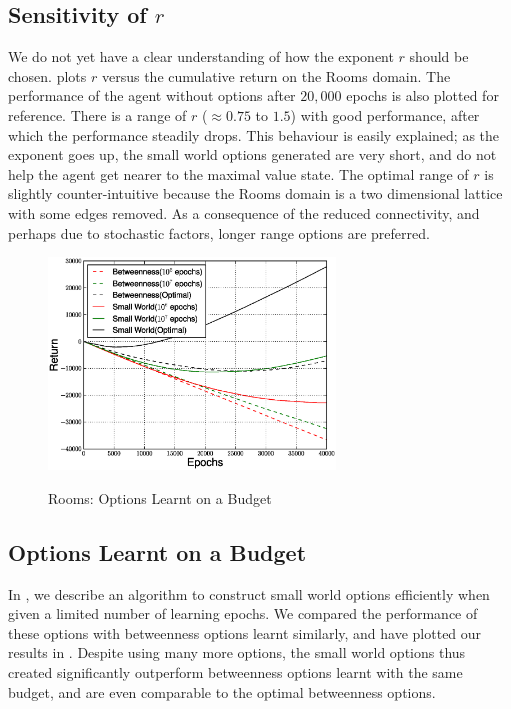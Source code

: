 \subsection{Sensitivity of $r$}
We do not yet have a clear understanding of how the exponent $r$ should
be chosen.  plots $r$ versus the cumulative return
on the Rooms domain. The performance of the agent without options after
$20,000$ epochs is also plotted for reference. There is a range of $r$
($\approx 0.75$ to $1.5$) with good performance, after which the
performance steadily drops. This behaviour is easily explained; as the
exponent goes up, the small world options generated are very short, and
do not help the agent get nearer to the maximal value state. The optimal
range of $r$ is slightly counter-intuitive because the Rooms domain is
a two dimensional lattice with some edges removed. As a consequence of
the reduced connectivity, and perhaps due to stochastic factors, longer
range options are preferred.

\begin{figure}[th]
  \centering
    \includegraphics[width=3in]{figures/rooms-learnt-200}
      \label{fig:rooms-learnt}
    \caption{Rooms: Options Learnt on a Budget}
\end{figure}

\subsection{Options Learnt on a Budget}
In , we describe an algorithm to construct small world
options efficiently when given a limited number of learning epochs. We
compared the performance of these options with betweenness options
learnt similarly, and have plotted our results in
. Despite using many more
options, the small world options thus created significantly outperform
betweenness options learnt with the same budget, and are even comparable
to the optimal betweenness options.

